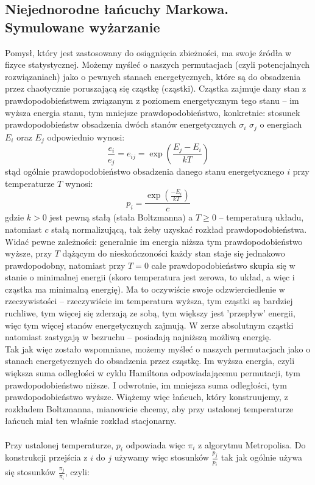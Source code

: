 \documentclass[a4paper]{article}
\theoremstyle{defn}
\theoremstyle{theorem}
\theoremstyle{lemma}
\theoremstyle{cor}
\theoremstyle{fact}
\begin{document}
\subsection{Niejednorodne łańcuchy Markowa. Symulowane wyżarzanie}
Pomysł, który jest zastosowany do osiągnięcia zbieżności, ma swoje źródła w fizyce statystycznej. Możemy myśleć o naszych permutacjach (czyli potencjalnych rozwiązaniach) jako o pewnych stanach energetycznych, które są do obsadzenia przez chaotycznie poruszającą się cząstkę (cząstki). Cząstka zajmuje dany stan z prawdopodobieństwem związanym z poziomem energetycznym tego stanu – im wyższa energia stanu, tym mniejsze prawdopodobieństwo, konkretnie: stosunek prawdopodobieństw obsadzenia dwóch stanów energetycznych $\sigma_i$ $\sigma_j$ o energiach $E_i$ oraz $E_j$ odpowiednio wynosi:
$$\frac{e_i}{e_j} = e_{ij} = \exp\left(\frac{E_j - E_i}{kT}\right)$$
stąd ogólnie prawdopodobieństwo obsadzenia danego stanu energetycznego $i$ przy temperaturze $T$ wynosi:
$$p_i = \frac{\exp(\frac{-E_i}{kT})}{c}$$
gdzie $k>0$ jest pewną stałą (stała Boltzmanna) a $T\geq0$ – temperaturą układu, natomiast $c$ stałą normalizującą, tak żeby uzyskać rozkład prawdopodobieństwa. Widać pewne zależności: generalnie im energia niższa tym prawdopodobieństwo wyższe, przy $T$ dążącym do nieskończoności każdy stan staje się jednakowo prawdopodobny, natomiast przy $T=0$ całe prawdopodobieństwo skupia się w stanie o minimalnej energii (skoro temperatura jest zerowa, to układ, a więc i cząstka ma minimalną energię). Ma to oczywiście swoje odzwierciedlenie w rzeczywistości – rzeczywiście im temperatura wyższa, tym cząstki są bardziej ruchliwe, tym więcej się zderzają ze sobą, tym większy jest 'przepływ' energii, więc tym więcej stanów energetycznych zajmują. W zerze absolutnym cząstki natomiast zastygają w bezruchu – posiadają najniższą możliwą energię.\\
Tak jak więc zostało wspomniane, możemy myśleć o naszych permutacjach jako o stanach energetycznych do obsadzenia przez cząstkę. Im wyższa energia, czyli większa suma odległości w cyklu Hamiltona odpowiadającemu permutacji, tym prawdopodobieństwo niższe. I odwrotnie, im mniejsza suma odległości, tym prawdopodobieństwo wyższe. Wiążemy więc łańcuch, który konstruujemy, z rozkładem Boltzmanna, mianowicie chcemy, aby przy ustalonej temperaturze łańcuch miał ten właśnie rozkład stacjonarny.\\\\
Przy ustalonej temperaturze, $p_i$ odpowiada więc $\pi_i$ z algorytmu Metropolisa. Do konstrukcji przejścia z $i$ do $j$ używamy więc stosunków $\frac{p_j}{p_i}$ tak jak ogólnie używa się stosunków $\frac{\pi_j}{\pi_i}$, czyli:
\end{document}
